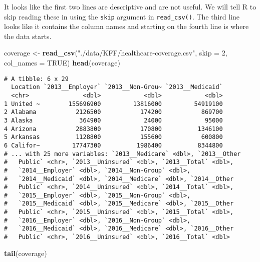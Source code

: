 \documentclass[]{article}
\newenvironment{Shaded}{\begin{snugshade}}{\end{snugshade}}
\newcommand{\DataTypeTok}[1]{\textcolor[rgb]{0.13,0.29,0.53}{#1}}
\newcommand{\DecValTok}[1]{\textcolor[rgb]{0.00,0.00,0.81}{#1}}
\newcommand{\KeywordTok}[1]{\textcolor[rgb]{0.13,0.29,0.53}{\textbf{#1}}}
\newcommand{\NormalTok}[1]{#1}
\newcommand{\OtherTok}[1]{\textcolor[rgb]{0.56,0.35,0.01}{#1}}
\newcommand{\StringTok}[1]{\textcolor[rgb]{0.31,0.60,0.02}{#1}}
\begin{document}
It looks like the first two lines are descriptive and are not useful. We
will tell R to skip reading these in using the \texttt{skip} argument in
\texttt{read\_csv()}. The third line looks like it contains the column
names and starting on the fourth line is where the data starts.

\begin{Shaded}
\begin{Highlighting}[]
\NormalTok{coverage <-}\StringTok{ }\KeywordTok{read_csv}\NormalTok{(}\StringTok{"./data/KFF/healthcare-coverage.csv"}\NormalTok{, }
                     \DataTypeTok{skip =} \DecValTok{2}\NormalTok{, }\DataTypeTok{col_names =} \OtherTok{TRUE}\NormalTok{)}
\KeywordTok{head}\NormalTok{(coverage)}
\end{Highlighting}
\end{Shaded}

\begin{verbatim}
# A tibble: 6 x 29
  Location `2013__Employer` `2013__Non-Grou~ `2013__Medicaid`
  <chr>               <dbl>            <dbl>            <dbl>
1 United ~        155696900         13816000         54919100
2 Alabama           2126500           174200           869700
3 Alaska             364900            24000            95000
4 Arizona           2883800           170800          1346100
5 Arkansas          1128800           155600           600800
6 Califor~         17747300          1986400          8344800
# ... with 25 more variables: `2013__Medicare` <dbl>, `2013__Other
#   Public` <chr>, `2013__Uninsured` <dbl>, `2013__Total` <dbl>,
#   `2014__Employer` <dbl>, `2014__Non-Group` <dbl>,
#   `2014__Medicaid` <dbl>, `2014__Medicare` <dbl>, `2014__Other
#   Public` <chr>, `2014__Uninsured` <dbl>, `2014__Total` <dbl>,
#   `2015__Employer` <dbl>, `2015__Non-Group` <dbl>,
#   `2015__Medicaid` <dbl>, `2015__Medicare` <dbl>, `2015__Other
#   Public` <chr>, `2015__Uninsured` <dbl>, `2015__Total` <dbl>,
#   `2016__Employer` <dbl>, `2016__Non-Group` <dbl>,
#   `2016__Medicaid` <dbl>, `2016__Medicare` <dbl>, `2016__Other
#   Public` <chr>, `2016__Uninsured` <dbl>, `2016__Total` <dbl>
\end{verbatim}

\begin{Shaded}
\begin{Highlighting}[]
\KeywordTok{tail}\NormalTok{(coverage)}
\end{Highlighting}
\end{Shaded}
\end{document}
